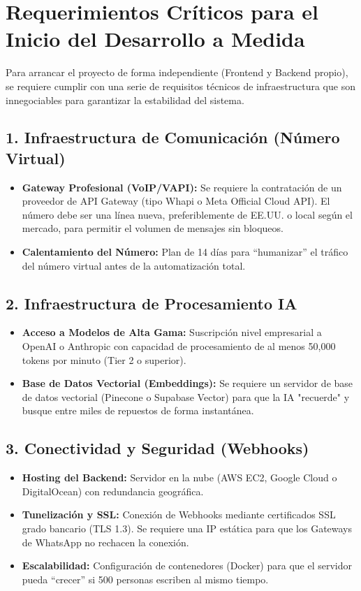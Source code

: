 \documentclass[12pt,a4paper]{article}
\begin{document}
\section{Requerimientos Críticos para el Inicio del Desarrollo a Medida}
Para arrancar el proyecto de forma independiente (Frontend y Backend propio), se requiere cumplir con una serie de requisitos t\'ecnicos de infraestructura que son innegociables para garantizar la estabilidad del sistema.

\subsection{1. Infraestructura de Comunicación (Número Virtual)}
\begin{itemize}
    \item \textbf{Gateway Profesional (VoIP/VAPI):} Se requiere la contratación de un proveedor de API Gateway (tipo Whapi o Meta Official Cloud API). El número debe ser una línea nueva, preferiblemente de EE.UU. o local según el mercado, para permitir el volumen de mensajes sin bloqueos.
    \item \textbf{Calentamiento del Número:} Plan de 14 días para ``humanizar'' el tráfico del número virtual antes de la automatización total.
\end{itemize}

\subsection{2. Infraestructura de Procesamiento IA}
\begin{itemize}
    \item \textbf{Acceso a Modelos de Alta Gama:} Suscripción nivel empresarial a OpenAI o Anthropic con capacidad de procesamiento de al menos 50,000 tokens por minuto (Tier 2 o superior).
    \item \textbf{Base de Datos Vectorial (Embeddings):} Se requiere un servidor de base de datos vectorial (Pinecone o Supabase Vector) para que la IA "recuerde" y busque entre miles de repuestos de forma instantánea.
\end{itemize}

\subsection{3. Conectividad y Seguridad (Webhooks)}
\begin{itemize}
    \item \textbf{Hosting del Backend:} Servidor en la nube (AWS EC2, Google Cloud o DigitalOcean) con redundancia geográfica.
    \item \textbf{Tunelización y SSL:} Conexión de Webhooks mediante certificados SSL grado bancario (TLS 1.3). Se requiere una IP est\'atica para que los Gateways de WhatsApp no rechacen la conexión.
    \item \textbf{Escalabilidad:} Configuración de contenedores (Docker) para que el servidor pueda ``crecer'' si 500 personas escriben al mismo tiempo.
\end{itemize}
\end{document}
